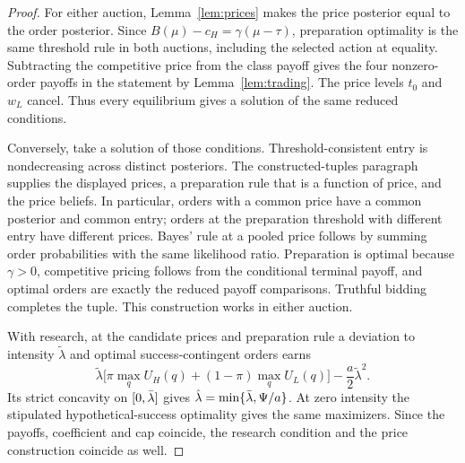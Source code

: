 \begin{proof}
For either auction, Lemma~\ref{lem:prices} makes the price posterior equal to the order posterior.
Since \(B(\mu)-c_H=\gamma(\mu-\tau)\), preparation optimality is the same threshold rule in both auctions,
including the selected action at equality. Subtracting the competitive price from the class payoff gives the
four nonzero-order payoffs in the statement by Lemma~\ref{lem:trading}. The price levels \(t_0\) and \(w_L\)
cancel. Thus every equilibrium gives a solution of the same reduced conditions.

Conversely, take a solution of those conditions. Threshold-consistent entry is nondecreasing across distinct
posteriors. The constructed-tuples paragraph supplies the displayed prices, a preparation rule that is a function
of price, and the price beliefs. In particular, orders with a common price have a common posterior and common
entry; orders at the preparation threshold with different entry have different prices. Bayes' rule at a pooled
price follows by summing order probabilities with the same likelihood ratio. Preparation is optimal because
\(\gamma>0\), competitive pricing follows from the conditional terminal payoff, and optimal orders are exactly
the reduced payoff comparisons. Truthful bidding completes the tuple. This construction works in either auction.

With research, at the candidate prices and preparation rule a deviation to intensity \(\tilde\lambda\) and optimal
success-contingent orders earns
\[
\tilde\lambda\bigl[\pi\max_qU_H(q)+(1-\pi)\max_qU_L(q)\bigr]-\frac a2\tilde\lambda^2.
\]
Its strict concavity on \([0,\bar\lambda]\) gives \(\hat\lambda=\min\{\bar\lambda,\Psi/a\}\).
At zero intensity the stipulated hypothetical-success optimality gives the same maximizers. Since the payoffs,
coefficient and cap coincide, the research condition and the price construction coincide as well.
\end{proof}

